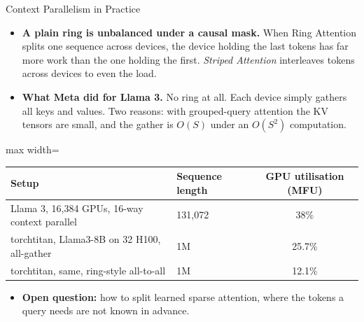 \begin{frame}{Context Parallelism in Practice}
    \begin{itemize}\itemsep0.5em
        \item \textbf{A plain ring is unbalanced under a causal mask.} When Ring Attention splits one sequence across devices, the device holding the last tokens has far more work than the one holding the first. \emph{Striped Attention} interleaves tokens across devices to even the load.
        \item \textbf{What Meta did for Llama 3.} No ring at all. Each device simply gathers all keys and values. Two reasons: with grouped-query attention the KV tensors are small, and the gather is $O(S)$ under an $O(S^2)$ computation.
    \end{itemize}
    \begin{center}
    \small
    \begin{adjustbox}{max width=\linewidth}\begin{tabular}{llc}
        \toprule
        \textbf{Setup} & \textbf{Sequence length} & \textbf{GPU utilisation (MFU)} \\
        \midrule
        Llama 3, 16,384 GPUs, 16-way context parallel & 131,072 & 38\% \\
        torchtitan, Llama3-8B on 32 H100, all-gather & 1M & 25.7\% \\
        torchtitan, same, ring-style all-to-all & 1M & 12.1\% \\
        \bottomrule
    \end{tabular}\end{adjustbox}
    \end{center}
    \begin{itemize}
        \item \textbf{Open question:} how to split learned sparse attention, where the tokens a query needs are not known in advance.
    \end{itemize}
\end{frame}


